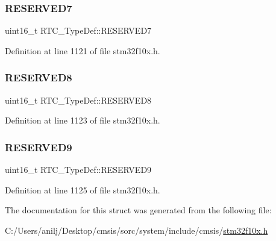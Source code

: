 \subsubsection{\texorpdfstring{R\+E\+S\+E\+R\+V\+E\+D7}{RESERVED7}}
{\footnotesize\ttfamily uint16\+\_\+t R\+T\+C\+\_\+\+Type\+Def\+::\+R\+E\+S\+E\+R\+V\+E\+D7}



Definition at line 1121 of file stm32f10x.\+h.

\mbox{\label{struct_r_t_c___type_def_a5b09d77c801dc948581ef113d8a352c9}} 
\subsubsection{\texorpdfstring{R\+E\+S\+E\+R\+V\+E\+D8}{RESERVED8}}
{\footnotesize\ttfamily uint16\+\_\+t R\+T\+C\+\_\+\+Type\+Def\+::\+R\+E\+S\+E\+R\+V\+E\+D8}



Definition at line 1123 of file stm32f10x.\+h.

\mbox{\label{struct_r_t_c___type_def_a3f83ce9cfda0c0e7f854ab65347058b1}} 
\subsubsection{\texorpdfstring{R\+E\+S\+E\+R\+V\+E\+D9}{RESERVED9}}
{\footnotesize\ttfamily uint16\+\_\+t R\+T\+C\+\_\+\+Type\+Def\+::\+R\+E\+S\+E\+R\+V\+E\+D9}



Definition at line 1125 of file stm32f10x.\+h.



The documentation for this struct was generated from the following file\+:\begin{DoxyCompactItemize}
\item 
C\+:/\+Users/anilj/\+Desktop/cmsis/sorc/system/include/cmsis/\hyperlink{stm32f10x_8h}{stm32f10x.\+h}\end{DoxyCompactItemize}
